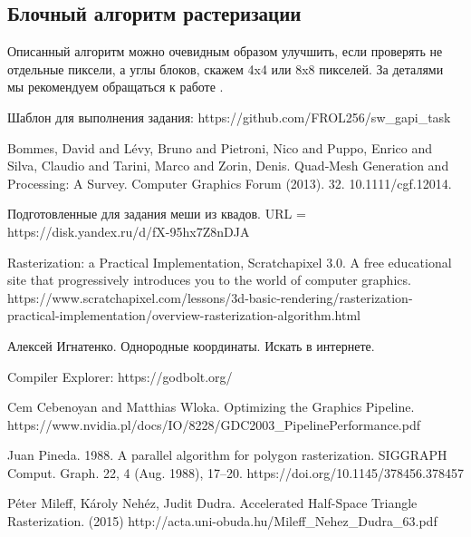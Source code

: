 \documentclass[12pt,subf,href,colorlinks=true]{article}
\begin{document}
\subsection{Блочный алгоритм растеризации}

Описанный алгоритм можно очевидным образом улучшить, если проверять не отдельные пиксели, а углы блоков, скажем 4x4 или 8x8 пикселей. За деталями мы рекомендуем обращаться к работе \cite{Mileff2015AcceleratedHT}. 


\begin{thebibliography}{9} 
	
 Шаблон для выполнения задания: https://github.com/FROL256/sw\_gapi\_task 

 Bommes, David and Lévy, Bruno and Pietroni, Nico and Puppo, Enrico and Silva, Claudio and Tarini, Marco and Zorin, Denis. Quad‐Mesh Generation and Processing: A Survey. Computer Graphics Forum (2013). 32. 10.1111/cgf.12014. 

 Подготовленные для задания меши из квадов. \newline URL = https://disk.yandex.ru/d/fX-95hx7Z8nDJA 

 Rasterization: a Practical Implementation, Scratchapixel 3.0. A free educational site that progressively introduces you to the world of computer graphics. https://www.scratchapixel.com/lessons/3d-basic-rendering/rasterization-practical-implementation/overview-rasterization-algorithm.html

 Алексей Игнатенко. Однородные координаты. Искать в интернете.

 Compiler Explorer: https://godbolt.org/

 Cem Cebenoyan and Matthias Wloka. Optimizing the Graphics Pipeline. https://www.nvidia.pl/docs/IO/8228/GDC2003\_PipelinePerformance.pdf

 Juan Pineda. 1988. A parallel algorithm for polygon rasterization. SIGGRAPH Comput. Graph. 22, 4 (Aug. 1988), 17–20. https://doi.org/10.1145/378456.378457

 Péter Mileff, Károly Nehéz, Judit Dudra.  Accelerated Half-Space Triangle Rasterization. (2015) http://acta.uni-obuda.hu/Mileff\_Nehez\_Dudra\_63.pdf

\end{thebibliography} 
\end{document}
